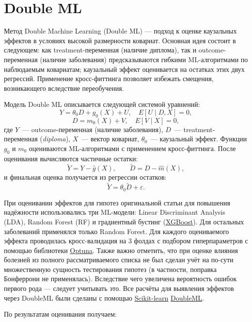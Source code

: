 \documentclass[a4paper,12pt]{article}
\begin{document}
\section{Double ML}

Метод Double Machine Learning (Double ML) --- подход к оценке каузальных эффектов в условиях высокой размерности ковариат. Основная идея состоит в следующем: как treatment-переменная (наличие диплома), так и outcome-переменная (наличие заболевания) предсказываются гибкими ML-алгоритмами по наблюдаемым ковариатам; каузальный эффект оценивается на остатках этих двух регрессий.
Применение кросс-фиттинга позволяет избежать смещения, возникающего вследствие переобучения.

Модель Double ML описывается следующей системой уравнений:
$$Y = \theta_0 D + g_0(X) + U, \quad E[U \mid D, X] = 0,$$
$$D = m_0(X) + V, \quad E[V \mid X] = 0,$$
где $Y$~--- outcome-переменная (наличие заболевания), $D$~--- treatment-переменная (\textit{diploma}), $X$~--- вектор ковариат, $\theta_0$~--- каузальный эффект.
Функции $g_0$ и $m_0$ оцениваются ML-алгоритмами с применением кросс-фиттинга.
После оценивания вычисляются частичные остатки:
$$\tilde{Y} = Y - \hat{g}(X), \qquad \tilde{D} = D - \hat{m}(X),$$
и финальная оценка получается из регрессии остатков:
$$\tilde{Y} = \theta_0 \tilde{D} + \varepsilon.$$

При оценивании эффектов для гипотез оригинальной статьи для повышения надёжности использовались три ML-модели: Linear Discriminant Analysis (LDA), Random Forest (RF) и градиентный бустинг (\href{https://xgboost.ai/}{XGBoost}). 
Для остальных заболеваний применялся только Random Forest.
Для каждого оцениваемого эффекта проводилась кросс-валидация на 3 фолдах с подбором гиперпараметров с помощью библиотеки \href{https://optuna.org/}{Optuna}. 
Также важно отметить, что при оценке влияния болезней из полного рассматриваемого списка не был сделан учёт на по-сути множественную сущность тестирования гипотез (в частности, поправка Бонферрони не применялась).
Вследствие чего увеличена вероятность ошибок первого рода --- следует учитывать это.
Все расчёты для выявления эффектов через DoubleML были сделаны с помощью \href{https://scikit-learn.org/stable/}{Scikit-learn} \href{https://docs.doubleml.org/stable/index.html}{DoubleML}.

По результатам оценивания получаем:
\end{document}
